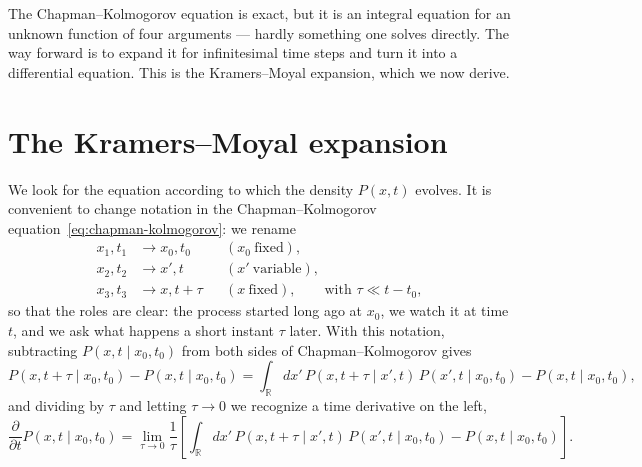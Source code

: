 The Chapman--Kolmogorov equation is exact, but it is an integral equation for an unknown function of four arguments --- hardly something one solves directly.
The way forward is to expand it for infinitesimal time steps and turn it into a differential equation.
This is the Kramers--Moyal expansion, which we now derive.


\section{The Kramers--Moyal expansion}

We look for the equation according to which the density $P(x,t)$ evolves.
It is convenient to change notation in the Chapman--Kolmogorov equation~\eqref{eq:chapman-kolmogorov}: we rename
\begin{equation}
\begin{aligned}
x_1,t_1 &\longrightarrow x_0,t_0 && (x_0\ \text{fixed}),\\
x_2,t_2 &\longrightarrow x',t   && (x'\ \text{variable}),\\
x_3,t_3 &\longrightarrow x,t+\tau && (x\ \text{fixed}),\qquad \text{with } \tau \ll t-t_0,
\end{aligned}
\end{equation}
so that the roles are clear: the process started long ago at $x_0$, we watch it at time $t$, and we ask what happens a short instant $\tau$ later.
With this notation, subtracting $P(x,t\mid x_0,t_0)$ from both sides of Chapman--Kolmogorov gives
\begin{equation}
P(x,t+\tau\mid x_0,t_0) - P(x,t\mid x_0,t_0) = \int_{\mathbb{R}} dx'\, P(x,t+\tau\mid x',t)\,P(x',t\mid x_0,t_0) - P(x,t\mid x_0,t_0),
\end{equation}
and dividing by $\tau$ and letting $\tau\to0$ we recognize a time derivative on the left,
\begin{equation}\label{eq:km-limit}
\frac{\partial}{\partial t}P(x,t\mid x_0,t_0)
= \lim_{\tau\to0}\frac{1}{\tau}\left[\int_{\mathbb{R}} dx'\, P(x,t+\tau\mid x',t)\,P(x',t\mid x_0,t_0) - P(x,t\mid x_0,t_0)\right].
\end{equation}

